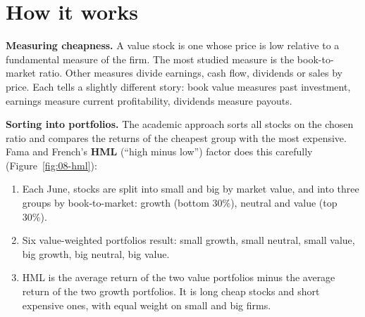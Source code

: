 \section{How it works}
\label{sec:08-how}

\textbf{Measuring cheapness.} A value stock is one whose price is low relative to a fundamental measure of the firm. The most studied measure is the book-to-market ratio. Other measures divide earnings, cash flow, dividends or sales by price. Each tells a slightly different story: book value measures past investment, earnings measure current profitability, dividends measure payouts.

\textbf{Sorting into portfolios.} The academic approach sorts all stocks on the chosen ratio and compares the returns of the cheapest group with the most expensive. Fama and French's \textbf{HML} (``high minus low'') factor does this carefully (Figure~\ref{fig:08-hml}):

\begin{enumerate}
  \item Each June, stocks are split into small and big by market value, and into three groups by book-to-market: growth (bottom 30\%), neutral and value (top 30\%).
  \item Six value-weighted portfolios result: small growth, small neutral, small value, big growth, big neutral, big value.
  \item HML is the average return of the two value portfolios minus the average return of the two growth portfolios. It is long cheap stocks and short expensive ones, with equal weight on small and big firms.
\end{enumerate}



